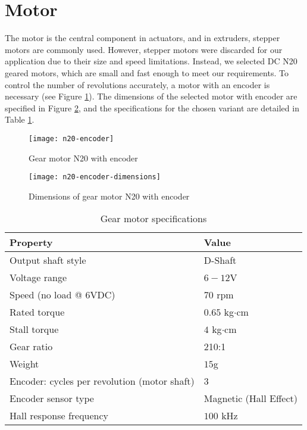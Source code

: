 \section{Motor}

The motor is the central component in actuators, and in extruders, stepper motors are commonly used. However, stepper motors were discarded for our application due to their size and speed limitations. Instead, we selected DC N20 geared motors, which are small and fast enough to meet our requirements. To control the number of revolutions accurately, a motor with an encoder is necessary (see Figure \ref{fig:n20-encoder}). The dimensions of the selected motor with encoder are specified in Figure \ref{fig:n20-encoder-dimensions}, and the specifications for the chosen variant are detailed in Table \ref{tab:motor-specs}.

\begin{figure}[H]
    \centering
    \texttt{[image: n20-encoder]}
    \caption{Gear motor N20 with encoder}
    \label{fig:n20-encoder}
\end{figure}

\begin{figure}[H]
    \centering
    \texttt{[image: n20-encoder-dimensions]}
    \caption{Dimensions of gear motor N20 with encoder}
    \label{fig:n20-encoder-dimensions}
\end{figure}


\begin{table}[H]
    \centering
    \caption{Gear motor specifications}
    \label{tab:motor-specs}
    \begin{tabular}{@{}ll@{}}
    \toprule
    Property                                     & Value                  \\
    \midrule
    Output shaft style                           & D-Shaft                \\
    Voltage range                                & $6-12$V                \\
    Speed (no load @ 6VDC)                       & $70$ rpm               \\
    Rated torque                                 & $0.65$ kg$\cdot$cm            \\
    Stall torque                                 & $4$ kg$\cdot$cm               \\
    Gear ratio                                   & 210:1                  \\
    Weight                                       & $15$g                  \\
    Encoder: cycles per revolution (motor shaft) & 3                      \\
    Encoder sensor type                          & Magnetic (Hall Effect) \\
    Hall response frequency                      & $100$ kHz              \\
    \bottomrule
    \end{tabular}
\end{table}

